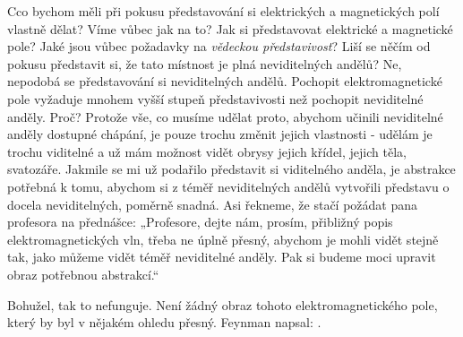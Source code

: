     Cco bychom měli při pokusu představování si elektrických a magnetických polí vlastně dělat? Víme
    vůbec jak na to? Jak si představovat elektrické a magnetické pole? Jaké jsou vůbec požadavky na
    \emph{vědeckou představivost}? Liší se něčím od pokusu představit si, že tato místnost je plná
    neviditelných andělů? Ne, nepodobá se představování si neviditelných andělů. Pochopit
    elektromagnetické pole vyžaduje mnohem vyšší stupeň představivosti než pochopit neviditelné
    anděly. Proč? Protože vše, co musíme udělat proto, abychom učinili neviditelné anděly dostupné
    chápání, je pouze trochu změnit jejich vlastnosti - udělám je trochu viditelné a už mám možnost
    vidět obrysy jejich křídel, jejich těla, svatozáře. Jakmile se mi už podařilo představit si
    viditelného anděla, je abstrakce potřebná k tomu, abychom si z téměř neviditelných andělů
    vytvořili představu o docela neviditelných, poměrně snadná. Asi řekneme, že stačí požádat pana
    profesora na přednášce: „Profesore, dejte nám, prosím, přibližný popis elektromagnetických vln,
    třeba ne úplně přesný, abychom je mohli vidět stejně tak, jako můžeme vidět téměř neviditelné
    anděly. Pak si budeme moci upravit obraz potřebnou abstrakcí.“
    
    Bohužel, tak to nefunguje. Není žádný obraz tohoto elektromagnetického pole, který by byl v
    nějakém ohledu přesný. Feynman napsal: .
    
